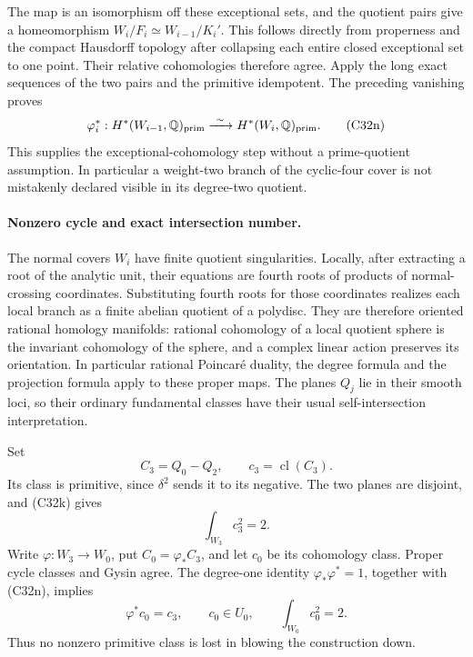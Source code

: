 \documentclass[11pt]{article}
\newcommand{\Q}{\mathbb Q}\newcommand{\C}{\mathbb C}\newcommand{\Z}{\mathbb Z}\newcommand{\R}{\mathbb R}\newcommand{\A}{\mathbb A}\newcommand{\OO}{\mathcal O}
\theoremstyle{definition}\newtheorem{definition}[theorem]{Definition}\newtheorem{remark}[theorem]{Remark}
\begin{document}
The map is an isomorphism off these exceptional
sets, and the quotient pairs give a homeomorphism
$W_i/F_i\simeq W_{i-1}/K_i'$.  This follows
directly from properness and the compact
Hausdorff topology after collapsing each entire
closed exceptional set to one point.  Their
relative cohomologies therefore agree.  Apply
the long exact sequences of the two pairs and
the primitive idempotent.  The preceding
vanishing proves
\[
 \varphi_i^*:H^*(W_{i-1},\Q)_{\rm prim}
                    \xrightarrow{\ \sim\ }
                    H^*(W_i,\Q)_{\rm prim}.
                                                        \tag{C32n}
\]
This supplies the exceptional-cohomology step
without a prime-quotient assumption.  In
particular a weight-two branch of the
cyclic-four cover is not mistakenly declared
visible in its degree-two quotient.

\paragraph{Nonzero cycle and exact intersection number.}
The normal covers $W_i$ have finite quotient
singularities.  Locally, after extracting a
root of the analytic unit, their equations
are fourth roots of products of normal-crossing
coordinates.  Substituting fourth roots for
those coordinates realizes each local branch
as a finite abelian quotient of a polydisc.
They are therefore oriented rational homology
manifolds: rational cohomology of a local
quotient sphere is the invariant cohomology
of the sphere, and a complex linear action
preserves its orientation.  In particular
rational Poincar\'e duality, the degree formula
and the projection formula apply to these
proper maps.  The planes $Q_j$ lie in their
smooth loci, so their ordinary fundamental
classes have their usual self-intersection
interpretation.

Set
\[
              C_3=Q_0-Q_2,\qquad c_3=\operatorname{cl}(C_3).
\]
Its class is primitive, since $\delta^2$ sends
it to its negative.  The two planes are
disjoint, and (C32k) gives
\[
                         \int_{W_3}c_3^2=2.
                                                        \tag{C32o}
\]
Write $\varphi:W_3\to W_0$, put
$C_0=\varphi_*C_3$, and let $c_0$ be its
cohomology class.  Proper cycle classes and
Gysin agree.  The degree-one identity
$\varphi_*\varphi^*=1$, together with (C32n),
implies
\[
       \varphi^*c_0=c_3,\qquad
       c_0\in U_0,\qquad
                         \int_{W_0}c_0^2=2.
                                                        \tag{C32p}
\]
Thus no nonzero primitive class is lost in
blowing the construction down.
\end{document}
